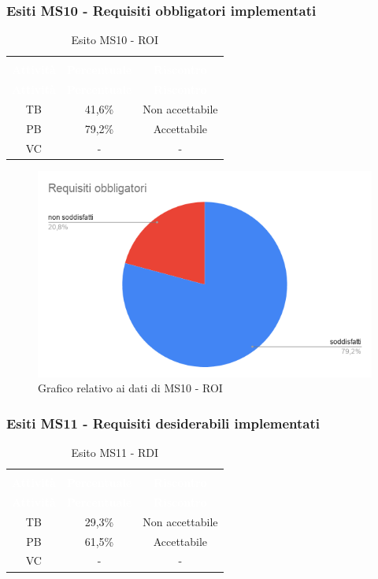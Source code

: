 \subsubsection{Esiti MS10 - Requisiti obbligatori implementati}
\begin{longtable}{c c c}
\rowcolor{white}\caption{Esito MS10 - ROI} \\
	\rowcolor{redafk}
\textcolor{white}{\textbf{Attività}} &
\textcolor{white}{\textbf{Percentuale}} & 
\textcolor{white}{\textbf{Riscontro}} \\
	\endfirsthead
\textcolor{white}{\textbf{Attività}} &
\textcolor{white}{\textbf{Percentuale}} & 
\textcolor{white}{\textbf{Riscontro}} \\
	\endhead
	TB & 41,6\% & Non accettabile\\
	PB & 79,2\% & Accettabile\\
	VC & - & -
\end{longtable}

\begin{figure}[H]
\centering
\includegraphics[scale=0.5]{./img/MG02.png}
\caption{Grafico relativo ai dati di MS10 - ROI}
\end{figure}


\subsubsection{Esiti MS11 - Requisiti desiderabili implementati}
\begin{longtable}{c c c}
\rowcolor{white}\caption{Esito MS11 - RDI} \\
	\rowcolor{redafk}
\textcolor{white}{\textbf{Attività}} &
\textcolor{white}{\textbf{Percentuale}} & 
\textcolor{white}{\textbf{Riscontro}} \\
	\endfirsthead
\textcolor{white}{\textbf{Attività}} &
\textcolor{white}{\textbf{Percentuale}} & 
\textcolor{white}{\textbf{Riscontro}} \\
	\endhead
	TB & 29,3\% & Non accettabile \\
	PB & 61,5\% & Accettabile \\
	VC & - & -
\end{longtable}

